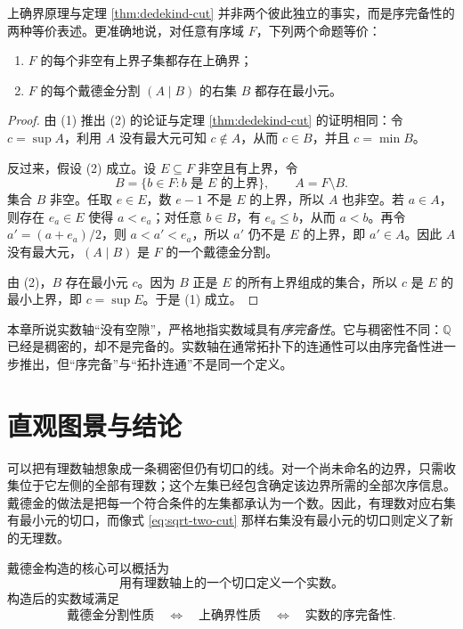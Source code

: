 \documentclass[UTF8,12pt,a4paper,fontset=fandol]{ctexbook}
\begin{document}
\begin{proposition}[两种完备性表述的等价性]
上确界原理与定理 \ref{thm:dedekind-cut} 并非两个彼此独立的事实，而是序完备性的两种等价表述。更准确地说，对任意有序域 $F$，下列两个命题等价：
\begin{enumerate}[label=(\arabic*)]
  \item $F$ 的每个非空有上界子集都存在上确界；
  \item $F$ 的每个戴德金分割 $(A\mid B)$ 的右集 $B$ 都存在最小元。
\end{enumerate}
\end{proposition}

\begin{proof}
由 (1) 推出 (2) 的论证与定理 \ref{thm:dedekind-cut} 的证明相同：令 $c=\sup A$，利用 $A$ 没有最大元可知 $c\notin A$，从而 $c\in B$，并且 $c=\min B$。

反过来，假设 (2) 成立。设 $E\subseteq F$ 非空且有上界，令
\[
  B=\{b\in F:b\text{ 是 }E\text{ 的上界}\},
  \qquad A=F\setminus B.
\]
集合 $B$ 非空。任取 $e\in E$，数 $e-1$ 不是 $E$ 的上界，所以 $A$ 也非空。若 $a\in A$，则存在 $e_a\in E$ 使得 $a<e_a$；对任意 $b\in B$，有 $e_a\le b$，从而 $a<b$。再令 $a'=(a+e_a)/2$，则 $a<a'<e_a$，所以 $a'$ 仍不是 $E$ 的上界，即 $a'\in A$。因此 $A$ 没有最大元，$(A\mid B)$ 是 $F$ 的一个戴德金分割。

由 (2)，$B$ 存在最小元 $c$。因为 $B$ 正是 $E$ 的所有上界组成的集合，所以 $c$ 是 $E$ 的最小上界，即 $c=\sup E$。于是 (1) 成立。
\end{proof}

\begin{remark}[“连续”一词的含义]
本章所说实数轴“没有空隙”，严格地指实数域具有\emph{序完备性}。它与稠密性不同：$\mathbb{Q}$ 已经是稠密的，却不是完备的。实数轴在通常拓扑下的连通性可以由序完备性进一步推出，但“序完备”与“拓扑连通”不是同一个定义。
\end{remark}

\section{直观图景与结论}

可以把有理数轴想象成一条稠密但仍有切口的线。对一个尚未命名的边界，只需收集位于它左侧的全部有理数；这个左集已经包含确定该边界所需的全部次序信息。戴德金的做法是把每一个符合条件的左集都承认为一个数。因此，有理数对应右集有最小元的切口，而像式 \eqref{eq:sqrt-two-cut} 那样右集没有最小元的切口则定义了新的无理数。

戴德金构造的核心可以概括为
\[
  \boxed{\text{用有理数轴上的一个切口定义一个实数。}}
\]
构造后的实数域满足
\[
  \boxed{\text{戴德金分割性质}
  \quad\Longleftrightarrow\quad
  \text{上确界性质}
  \quad\Longleftrightarrow\quad
  \text{实数的序完备性}.}
\]
\end{document}
